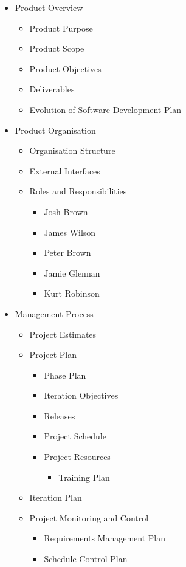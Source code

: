 \begin{itemize}
	\item Product Overview
	\begin{itemize}
		\item Product Purpose
		\item Product Scope
		\item Product Objectives
		\item Deliverables
		\item Evolution of Software Development Plan
	\end{itemize}
	\item Product Organisation
	\begin{itemize}
		\item Organisation Structure
		\item External Interfaces
		\item Roles and Responsibilities
		\begin{itemize}
			\item Josh Brown
			\item James Wilson
			\item Peter Brown
			\item Jamie Glennan
			\item Kurt Robinson
		\end{itemize}
	\end{itemize}
	\item Management Process
	\begin{itemize}
		\item Project Estimates
		\item Project Plan
		\begin{itemize}
			\item Phase Plan
			\item Iteration Objectives
			\item Releases
			\item Project Schedule
			\item Project Resources
			\begin{itemize}
				\item Training Plan
			\end{itemize}
		\end{itemize}
		\item Iteration Plan
		\item Project Monitoring and Control
		\begin{itemize}
			\item Requirements Management Plan
			\item Schedule Control Plan

\end{itemize}
\end{itemize}
\end{itemize}
